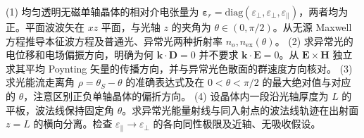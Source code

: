(1) 均匀透明无磁单轴晶体的相对介电张量为 \(\boldsymbol\varepsilon_r=\mathrm{diag}(\varepsilon_\perp,\varepsilon_\perp,\varepsilon_\parallel)\)，两者均为正。平面波波矢在 \(xz\) 平面，与光轴 \(z\) 的夹角为 \(\theta\in(0,\pi/2)\)。从无源 Maxwell 方程推导本征波方程及普通光、异常光两种折射率 \(n_o,n_{\mathrm{ex}}(\theta)\)。
(2) 求异常光的电位移和电场偏振方向，明确为何 \(\mathbf k\cdot\mathbf D=0\) 并不要求 \(\mathbf k\cdot\mathbf E=0\)。从 \(\mathbf E\times\mathbf H\) 独立求其平均 Poynting 矢量的传播方向，并与异常光色散面的群速度方向核对。
(3) 求光能流走离角 \(\rho=\theta_S-\theta\) 的准确表达式及在 \(0<\theta<\pi/2\) 的最大绝对值与对应的 \(\theta\)，注意区别正负单轴晶体的偏折方向。
(4) 设晶体内一段沿光轴厚度为 \(L\) 的平板，波法线保持固定角 \(\theta\)。求异常光能量射线与同入射点的波法线轨迹在出射面 \(z=L\) 的横向分离。检查 \(\varepsilon_\parallel\to\varepsilon_\perp\) 的各向同性极限及近轴、无吸收假设。

